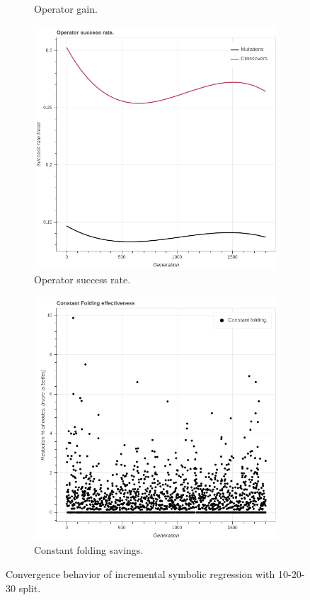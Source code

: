 \begin{figure}
\begin{subfigure}{0.5\textwidth}
        \caption{Operator gain.}
    \end{subfigure}
        \begin{subfigure}{0.5\textwidth}
        \includegraphics[width=0.8\linewidth]{figures/incrementaloperatorsuccessrate30s.png}
        \caption{Operator success rate.}
    \end{subfigure}
    \begin{subfigure}{0.5\textwidth}
        \includegraphics[width=0.8\linewidth]{figures/incrementalconstfolding30s.png}
        \caption{Constant folding savings.}
    \end{subfigure}
    \caption{Convergence behavior of incremental symbolic regression with 10-20-30 split.}
    \label{fig:incrementalseededconvergence}
\end{figure}
